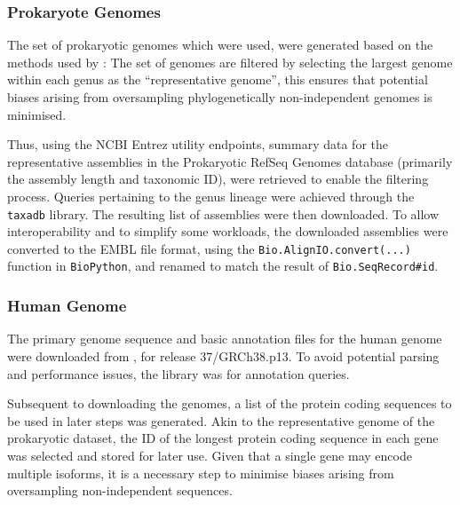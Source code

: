 \documentclass[../main.tex]{subfile}
\begin{document}
        \subsubsection{Prokaryote Genomes}
            The set of prokaryotic genomes which were used, were generated based on the methods used by \textcite{Ho2019}: The set of genomes are filtered by selecting the largest genome within each genus as the ``representative genome'', this ensures that potential biases arising from oversampling phylogenetically non-independent genomes is minimised.

            Thus, using the NCBI Entrez utility endpoints, summary data for the representative assemblies in the Prokaryotic RefSeq Genomes database (primarily the assembly length and taxonomic ID), were retrieved to enable the filtering process. Queries pertaining to the genus lineage were achieved through the \texttt{taxadb} library. The resulting list of assemblies were then downloaded. To allow interoperability and to simplify some workloads, the downloaded assemblies were converted to the EMBL file format, using the \texttt{Bio.AlignIO.convert(...)} function in \texttt{BioPython}, and renamed to match the result of \texttt{Bio.SeqRecord#id}.

        \subsubsection{Human Genome}
            The primary genome sequence and basic annotation files for the human genome were downloaded from \href{GENCODE}{\color{blue}{https://www.gencodegenes.org/human/}}, for release 37/GRCh38.p13. To avoid potential parsing and performance issues, the  library was for annotation queries.

            Subsequent to downloading the genomes, a list of the protein coding sequences to be used in later steps was generated. Akin to the representative genome of the prokaryotic dataset, the ID of the longest protein coding sequence in each gene was selected and stored for later use. Given that a single gene may encode multiple isoforms, it is a necessary step to minimise biases arising from oversampling non-independent sequences.
\end{document}
